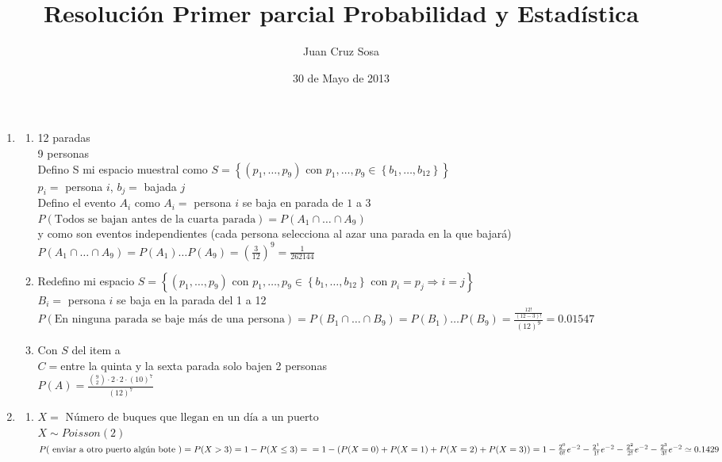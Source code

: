 \documentclass[a4paper,10pt]{article}
\title{ Resolución Primer parcial Probabilidad y Estadística }
\author{Juan Cruz Sosa}
\date{30 de Mayo de 2013}
\newcommand{\poisson}[2]{\frac{#2^{#1}}{#1!}e^{-#2}}
\begin{document}
\maketitle
\begin{enumerate}
\item 
\begin{enumerate}
\item
12 paradas \\
9 personas \\
Defino S mi espacio muestral como $S = \left\lbrace (p_1,\dots,p_9) \mbox { con } p_1,\dots,p_9 \in \left\lbrace b_1,\dots,b_{12} \right\rbrace \right\rbrace$ \\
$p_i =$ persona $i$, $b_j = $ bajada $j$ \\
Defino el evento $A_i$ como $A_i = $ persona $i$ se baja en parada de $1$ a $3$ \\
$P(\mbox{Todos se bajan antes de la cuarta parada}) = P(A_1 \cap \dots \cap A_9)$ \\
y como son eventos independientes (cada persona selecciona al azar una parada en la que bajará) \\
$P(A_1 \cap \dots \cap A_9) = P(A_1) \dots P(A_9) = { \left( \frac{3}{12} \right)}^{9}=\frac{1}{262144}$
\item
Redefino mi espacio $S = \left\lbrace (p_1,\dots,p_9) \mbox { con } p_1,\dots,p_9 \in \left\lbrace b_1,\dots,b_{12} \right\rbrace \mbox{ con } p_i = p_j \Rightarrow i = j \right\rbrace$ \\
$B_i = $ persona $i$ se baja en la parada del 1 a 12 \\
$P(\mbox{En ninguna parada se baje más de una persona}) = P(B_1 \cap \dots \cap B_9) = P(B_1) \dots P(B_9) = \frac{\frac{12!}{(12-3)!}}{(12)^{9}} = 0.01547$  
\item 
Con $S$ del item a \\
$C = $entre la quinta y la sexta parada solo bajen 2 personas \\
$P(A) = \frac{\binom{9}{2}\cdot 2 \cdot 2 \cdot (10)^{7}}{(12)^{7}}$
\end{enumerate}
\item 
\begin{enumerate}
\item
$X = \mbox{ Número de buques que llegan en un día a un puerto }$ \\
$X \sim Poisson(2)$ \\
$P(\mbox{ enviar a otro puerto algún bote }) = P(X > 3) = 1-P(X \leq 3) = \\ =1-\left(P(X=0)+P(X=1)+P(X=2)+P(X=3) \right) = 1-\poisson {0}{2}-\poisson {1}{2}-\poisson {2}{2}-\poisson {3}{2} \simeq 0.1429$

\end{enumerate}
\end{enumerate}
\end{document}
